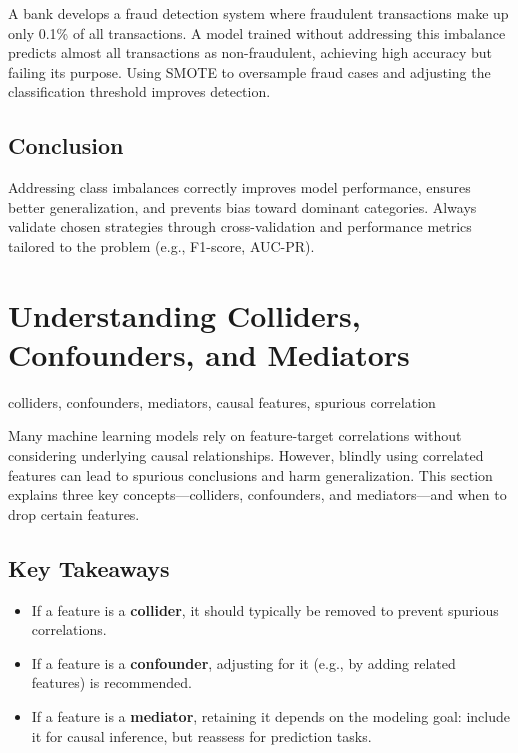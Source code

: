 \documentclass[12pt,openany]{book}
\begin{document}
\begin{examplebox}
A bank develops a fraud detection system where fraudulent transactions make up only 0.1\% of all transactions. A model trained without addressing this imbalance predicts almost all transactions as non-fraudulent, achieving high accuracy but failing its purpose. Using SMOTE to oversample fraud cases and adjusting the classification threshold improves detection.
\end{examplebox}


\subsection{Conclusion}

Addressing class imbalances correctly improves model performance, ensures better generalization, and prevents bias toward dominant categories. Always validate chosen strategies through cross-validation and performance metrics tailored to the problem (e.g., F1-score, AUC-PR).



\section{Understanding Colliders, Confounders, and Mediators}

\begin{keywordsbox}
colliders, confounders, mediators, causal features, spurious correlation
\end{keywordsbox}

Many machine learning models rely on feature-target correlations without considering underlying causal relationships. However, blindly using correlated features can lead to spurious conclusions and harm generalization. This section explains three key concepts—colliders, confounders, and mediators—and when to drop certain features.

\subsection{Key Takeaways}
\begin{itemize}
    \item If a feature is a \textbf{collider}, it should typically be removed to prevent spurious correlations.
    \item If a feature is a \textbf{confounder}, adjusting for it (e.g., by adding related features) is recommended.
    \item If a feature is a \textbf{mediator}, retaining it depends on the modeling goal: include it for causal inference, but reassess for prediction tasks.
\end{itemize}
\end{document}
